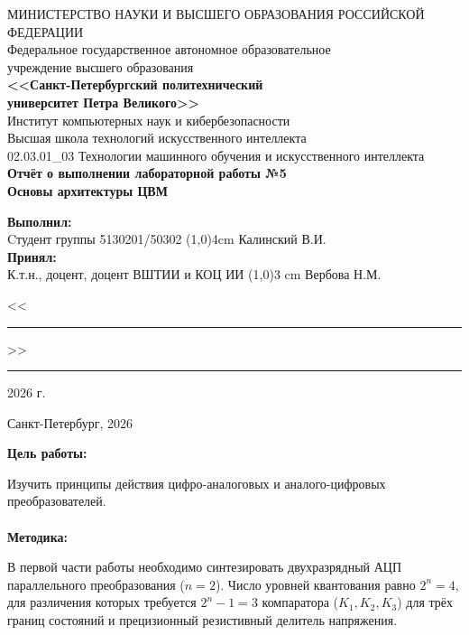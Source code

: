 \documentclass[14pt, a4paper]{extarticle}
\begin{document}
	\thispagestyle{empty}
	\begin{center}
		\hspace{0.2cm}МИНИСТЕРСТВО НАУКИ И ВЫСШЕГО ОБРАЗОВАНИЯ РОССИЙСКОЙ ФЕДЕРАЦИИ\\
		Федеральное государственное автономное образовательное\\
		учреждение высшего образования\\
		{\bf <<Санкт-Петербургский политехнический\\
			университет Петра Великого>>}\\
		Институт компьютерных наук и кибербезопасности\\
		Высшая школа технологий искусственного интеллекта\\
		02.03.01\_03 Технологии машинного обучения и искусственного интеллекта\\
		\vspace{3cm}
		\Large\bf{
			Отчёт о выполнении лабораторной работы №5\\
			Основы архитектуры ЦВМ\\[1cm]
		}
	\end{center}
	\vspace{2cm}
	\begin{flushleft}
		{\bf Выполнил:}\\
		Cтудент группы 5130201/50302 \hfill
		\line(1,0){4cm} \quad Калинский В.И.\\
		{\bf Принял:}\\
		К.т.н., доцент, доцент ВШТИИ и КОЦ ИИ \hfill
		\line(1,0){3 cm} \quad Вербова Н.М.\\[0.5cm]
		{ \hfill<<\rule{1cm}{0.5pt}>>\rule{2cm}{0.5pt}\hspace{3pt}2026 г.}
	\end{flushleft}
	\vspace{1cm}
	\begin{center}
		Санкт-Петербург, 2026
	\end{center}
	\newpage
	\noindent \textbf{Цель работы:}
	
	Изучить принципы действия цифро-аналоговых и аналого-цифровых
	преобразователей.
	\\\\
	\noindent \textbf{Методика:}
	
	В первой части работы необходимо синтезировать двухразрядный АЦП параллельного преобразования ($n = 2$). Число уровней квантования равно $2^n = 4$, для различения которых требуется $2^n - 1 = 3$ компаратора ($K_1, K_2, K_3$) для трёх границ состояний и прецизионный резистивный делитель напряжения.
	
\end{document}
